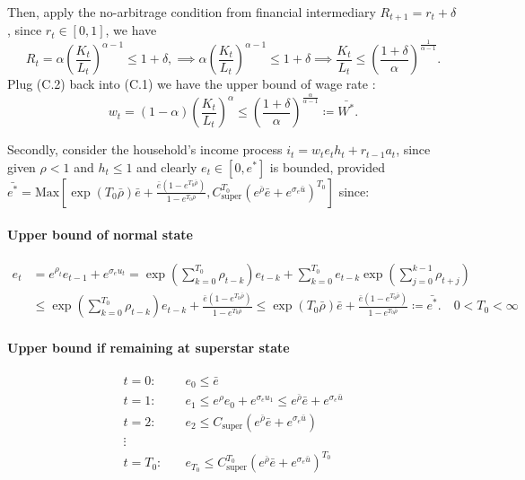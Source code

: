 \documentclass[11pt]{article}
\begin{document}
Then, apply the no-arbitrage condition from financial intermediary $R_{t+1} = r_t + \delta$, since $r_t \in [0,1]$, we have 
\begin{equation}
  R_{t} = \alpha \left( \frac{K_t}{L_t} \right)^{\alpha - 1} \le 1+\delta, 
  \implies \alpha \left( \frac{K_t}{L_t} \right)^{\alpha-1} \le 1+\delta 
  \implies \frac{K_t}{L_t} \le \left(\frac{1+\delta}{\alpha}\right)^{\frac{1}{\alpha-1}}.
\end{equation}
Plug (C.2) back into (C.1) we have the upper bound of wage rate :
\[
 w_t = (1 - \alpha) \left( \frac{K_t}{L_t} \right)^{\alpha} \leq \left( \frac{1+\delta}{\alpha} \right)^{\frac{\alpha}{\alpha-1}} \coloneqq \bar{W^*}.
\]

Secondly, consider the household's income process $i_t = w_t e_t h_t + r_{t-1} a_t$, since given $\rho<1$ and $h_t \leq 1$ and clearly $e_t \in [0, e^{*}]$ is bounded, provided 
$\bar{e^*} = \text{Max} \left[\exp\left(T_0\bar{\rho}\right)\bar{e} + \frac{\bar{e}\left(1-e^{T_0\bar{\rho}}\right)}{1-e^{T_0\bar{\rho}}}, C_{\text{super}}^{T_0}\left(e^{\bar{\rho}} \bar{e} + e^{\sigma_e \bar{u}}\right)^{T_0}\right] $ since:

\paragraph{Upper bound of normal state}

\begin{equation*}
\begin{aligned}
  e_{t} &=
    e^{\rho_t}e_{t-1}+e^{\sigma_e u_t} 
    = \exp\left(\sum_{k=0}^{T_0}\rho_{t-k}\right)e_{t-k} + \sum_{k=0}^{T_0} e_{t-k}\exp\!\left(\sum_{j=0}^{k-1}\rho_{t+j}\right) \\
  & \leq \exp\left(\sum_{k=0}^{T_0}\rho_{t-k}\right)e_{t-k} + \frac{\bar{e}\left(1-e^{T_0\bar{\rho}}\right)}{1-e^{T_0\bar{\rho}}} 
  \leq \exp\left(T_0\bar{\rho}\right)\bar{e} + \frac{\bar{e}\left(1-e^{T_0\bar{\rho}}\right)}{1-e^{T_0\bar{\rho}}} \coloneqq \bar{e^*}. \quad 0<T_0<\infty
\end{aligned}
\end{equation*}

\paragraph{Upper bound if remaining at superstar state}

\begin{equation*}
  \begin{aligned}
    t = 0: &\quad e_0 \leq \bar{e} \\
    t = 1: &\quad e_1 \leq e^{\rho} e_0 + e^{\sigma_e u_1} 
              \leq e^{\bar{\rho}} \bar{e} + e^{\sigma_e \bar{u}} \\
    t = 2: &\quad e_2 \leq C_{\text{super}}\left(e^{\bar{\rho}} \bar{e} + e^{\sigma_e \bar{u}}\right) \\
    \vdots \\
    t = T_0: &\quad e_{T_0} \leq C_{\text{super}}^{T_0}\left(e^{\bar{\rho}} \bar{e} + e^{\sigma_e \bar{u}}\right)^{T_0}
  \end{aligned}
\end{equation*}

\pagebreak

\printbibliography[title={REFERENCES }, heading=bibintoc]
\end{document}
